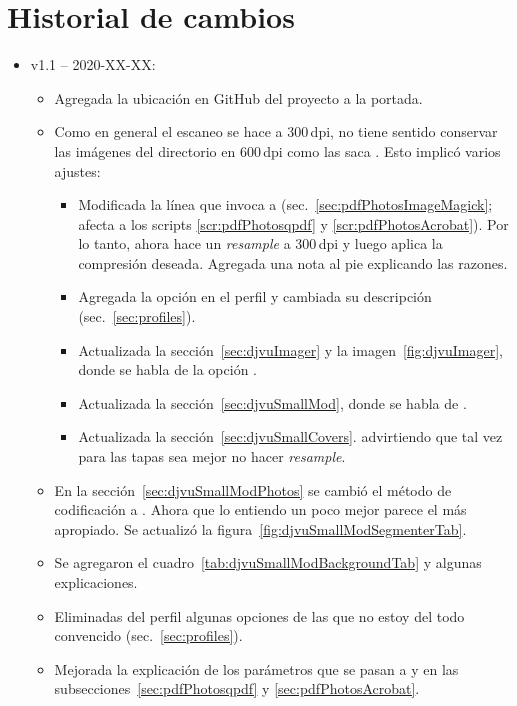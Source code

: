 \documentclass[%
	a5paper,
	10pt,
	twoside,
	openright,
	final,
]{memoir}
\begin{document}
\cleardoublepage\listoffigures
\cleardoublepage\listoftables
\cleardoublepage\listofscripts

\chapter{Historial de cambios}
	\begin{itemize}
		\item v1.1 -- 2020-XX-XX: 
			\begin{itemize}
				\item Agregada la ubicación en GitHub del proyecto a la portada.
				\item Como en general el escaneo se hace a 300\,dpi, no tiene sentido conservar las imágenes del directorio  en 600\,dpi como las saca \scantailor. Esto implicó varios ajustes:
				\begin{itemize}
					\item Modificada la línea que invoca a \imagemagick (sec.~\ref{sec:pdfPhotosImageMagick}; afecta a los scripts \ref{scr:pdfPhotosqpdf} y \ref{scr:pdfPhotosAcrobat}). Por lo tanto, ahora \imagemagick hace un \emph{resample} a 300\,dpi y luego aplica la compresión \jpeg deseada. Agregada una nota al pie explicando las razones.
					\item Agregada la opción  en el perfil  y cambiada su descripción (sec.~\ref{sec:profiles}).
					\item Actualizada la sección~\ref{sec:djvuImager} y la imagen~\ref{fig:djvuImager}, donde se habla de la opción .
					\item Actualizada la sección~\ref{sec:djvuSmallMod}, donde se habla de .
					\item Actualizada la sección~\ref{sec:djvuSmallCovers}. advirtiendo que tal vez para las tapas sea mejor no hacer \emph{resample}.
				\end{itemize}
				\item En la sección~\ref{sec:djvuSmallModPhotos} se cambió el método de codificación a . Ahora que lo entiendo un poco mejor parece el más apropiado. Se actualizó la figura~\ref{fig:djvuSmallModSegmenterTab}.
				\item Se agregaron el cuadro~\ref{tab:djvuSmallModBackgroundTab} y algunas explicaciones.
				\item Eliminadas del perfil  algunas opciones de las que no estoy del todo convencido (sec.~\ref{sec:profiles}).
				\item Mejorada la explicación de los parámetros que se pasan a \qpdf y \acrobat en las subsecciones~\ref{sec:pdfPhotosqpdf} y \ref{sec:pdfPhotosAcrobat}.

\end{itemize}
\end{itemize}
\end{document}
